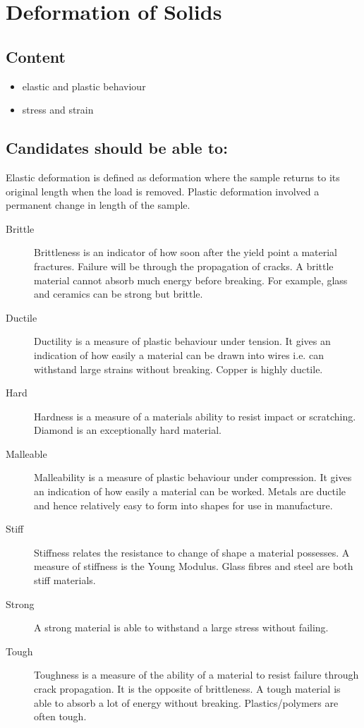 \documentclass[main.tex]{subfiles}
\begin{document}
\chapter{Deformation of Solids}
\section*{Content}
\begin{itemize}
\item elastic and plastic behaviour
\item stress and strain
\end{itemize}

\section*{Candidates should be able to:}

Elastic deformation is defined as deformation where the sample returns to its original length when the load is removed. Plastic deformation involved a permanent change in length of the sample.


\begin{description}
    \item[Brittle] Brittleness is an indicator of how soon after the yield point a material fractures. Failure will be through the propagation of cracks. A brittle material cannot absorb much energy before breaking. For example, glass and ceramics can be strong but brittle.
    \item[Ductile] Ductility is a measure of plastic behaviour under tension. It gives an indication of how easily a material can be drawn into wires i.e. can withstand large strains without breaking. Copper is highly ductile.
    \item[Hard] Hardness is a measure of a materials ability to resist impact or scratching. Diamond is an exceptionally hard material.
    \item[Malleable] Malleability is a measure of plastic behaviour under compression. It gives an indication of how easily a material can be worked. Metals are ductile and hence relatively easy to form into shapes for use in manufacture.
    \item[Stiff] Stiffness relates the resistance to change of shape a material possesses. A measure of stiffness is the Young Modulus. Glass fibres and steel are both stiff materials.
    \item[Strong] A strong material is able to withstand a large stress without failing.
    \item[Tough] Toughness is a measure of the ability of a material to resist failure through crack propagation. It is the opposite of brittleness. A tough material is able to absorb a lot of energy without breaking. Plastics/polymers are often tough.
\end{description}
\end{document}
